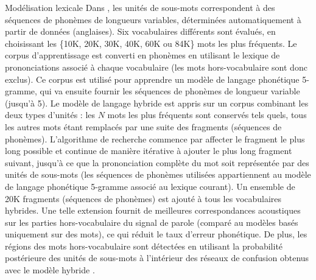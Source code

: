 \documentclass{style/these}
\let\oldcite=\cite
\renewcommand{\cite}[1]{{\fontfamily{qcs}\selectfont{\color{darkerblue}[\oldcite{#1}]}}}
\begin{document}
\begin{part}{Modélisation lexicale}
Dans \cite{Rastrow:2009_1}, les unités de sous-mots correspondent à des séquences de phonèmes de longueurs variables, déterminées automatiquement à partir de données (anglaises). 
Six vocabulaires différents sont évalués, en choisissant les \{10K, 20K, 30K, 40K, 60K ou 84K\} mots les plus fréquents. 
Le corpus d'apprentissage est converti en phonèmes en utilisant le lexique de prononciations associé à chaque vocabulaire (les mots hors-vocabulaire sont donc exclus).  
Ce corpus est utilisé pour apprendre un modèle de langage phonétique 5-gramme, qui va ensuite fournir les séquences de phonèmes de longueur variable (jusqu'à 5). 
Le modèle de langage hybride est appris sur un corpus combinant les deux types d'unités :  les $N$ mots les plus fréquents sont conservés tels quels, tous les autres mots étant remplacés par une suite des fragments (séquences de phonèmes). 
L'algorithme de recherche commence par affecter le fragment le plus long possible et continue de manière itérative à ajouter le plus long fragment suivant, jusqu'à ce que la prononciation complète du mot soit représentée par des unités de sous-mots (les séquences de phonèmes utilisées appartiennent au modèle de langage phonétique 5-gramme associé au lexique courant). 
Un ensemble de 20K fragments (séquences de phonèmes) est ajouté à tous les vocabulaires hybrides. 
Une telle extension fournit de meilleures correspondances acoustiques sur les parties hors-vocabulaire du signal de parole (comparé au modèles basés uniquement sur des mots), ce qui réduit le taux d'erreur phonétique. 
De plus, les régions des mots hors-vocabulaire sont détectées en utilisant la probabilité postérieure des unités de sous-mots à l'intérieur des réseaux de confusion obtenus avec le modèle hybride \cite{Rastrow:2009_2}. 


\end{part}
\end{document}
